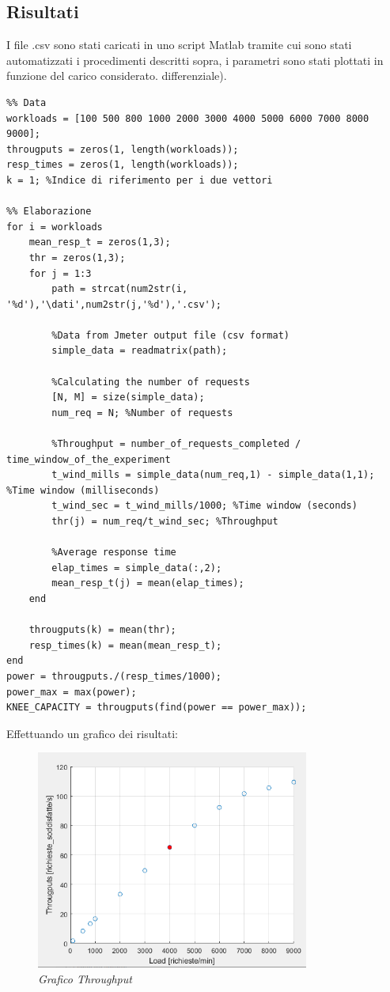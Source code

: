 \subsection{Risultati}
I file .csv sono stati caricati in uno script Matlab tramite cui sono stati automatizzati i procedimenti descritti sopra, i parametri sono stati plottati in funzione del carico considerato.
differenziale).
\begin{verbatim}
%% Data
workloads = [100 500 800 1000 2000 3000 4000 5000 6000 7000 8000 9000];
througputs = zeros(1, length(workloads));
resp_times = zeros(1, length(workloads));
k = 1; %Indice di riferimento per i due vettori

%% Elaborazione
for i = workloads
	mean_resp_t = zeros(1,3);
	thr = zeros(1,3);
	for j = 1:3
		path = strcat(num2str(i, '%d'),'\dati',num2str(j,'%d'),'.csv');
		
		%Data from Jmeter output file (csv format)
		simple_data = readmatrix(path);
		
		%Calculating the number of requests
		[N, M] = size(simple_data);
		num_req = N; %Number of requests
		
		%Throughput = number_of_requests_completed / time_window_of_the_experiment
		t_wind_mills = simple_data(num_req,1) - simple_data(1,1); %Time window (milliseconds)
		t_wind_sec = t_wind_mills/1000; %Time window (seconds)
		thr(j) = num_req/t_wind_sec; %Throughput
		
		%Average response time
		elap_times = simple_data(:,2);
		mean_resp_t(j) = mean(elap_times);
	end

	througputs(k) = mean(thr);
	resp_times(k) = mean(mean_resp_t);
end
power = througputs./(resp_times/1000);
power_max = max(power);
KNEE_CAPACITY = througputs(find(power == power_max));
\end{verbatim}
Effettuando un grafico dei risultati:
\begin{figure}[H]
	\centering
	\includegraphics[width=0.8\textwidth]{img/hw2/Throughput.png}
	\caption{\textit{Grafico Throughput}}
\end{figure}

